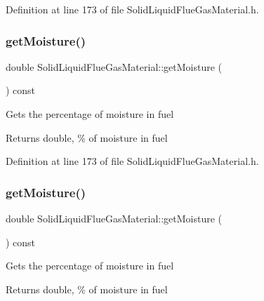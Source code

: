 Definition at line 173 of file Solid\+Liquid\+Flue\+Gas\+Material.\+h.

\mbox{\label{class_solid_liquid_flue_gas_material_accf3c8be942d0ba244f6eabab6e7012b}} 
\subsubsection{\texorpdfstring{get\+Moisture()}{getMoisture()}\hspace{0.1cm}{\footnotesize\ttfamily [2/3]}}
{\footnotesize\ttfamily double Solid\+Liquid\+Flue\+Gas\+Material\+::get\+Moisture (\begin{DoxyParamCaption}{ }\end{DoxyParamCaption}) const\hspace{0.3cm}{\ttfamily [inline]}}

Gets the percentage of moisture in fuel \begin{DoxyReturn}{Returns}
double, \% of moisture in fuel 
\end{DoxyReturn}


Definition at line 173 of file Solid\+Liquid\+Flue\+Gas\+Material.\+h.

\mbox{\label{class_solid_liquid_flue_gas_material_accf3c8be942d0ba244f6eabab6e7012b}} 
\subsubsection{\texorpdfstring{get\+Moisture()}{getMoisture()}\hspace{0.1cm}{\footnotesize\ttfamily [3/3]}}
{\footnotesize\ttfamily double Solid\+Liquid\+Flue\+Gas\+Material\+::get\+Moisture (\begin{DoxyParamCaption}{ }\end{DoxyParamCaption}) const\hspace{0.3cm}{\ttfamily [inline]}}

Gets the percentage of moisture in fuel \begin{DoxyReturn}{Returns}
double, \% of moisture in fuel 
\end{DoxyReturn}



